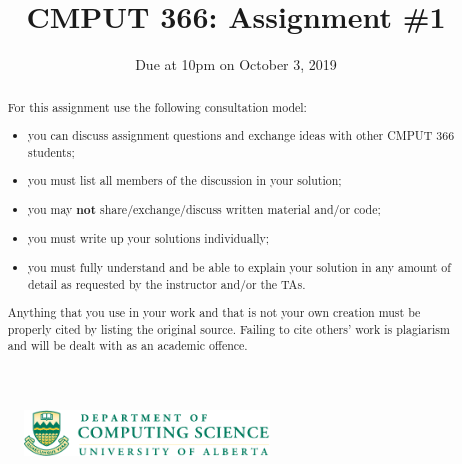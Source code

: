 \documentclass[10pt]{article}
\newcommand{\nin}{\noindent}
\newcommand{\ie}{\item}
\newcommand{\bei}{\begin{itemize}}
\newcommand{\eei}{\end{itemize}}
\newcommand{\tcm}[1]{\textcolor{m7}{#1}}
\begin{document}
\begin{figure}[t!]
\begin{center}
\includegraphics[width=6.5cm]{csLogo.pdf} %
\vspace{-1cm}
\end{center}
\end{figure}



\sloppy


\title{\bf CMPUT 366: Assignment \#1}

\author{\tcm{Due at 10pm on October 3, 2019}}

\date{}




\maketitle

\begin{abstract}
\nin For this assignment use the following consultation model: \bei

\ie you can discuss assignment questions and exchange ideas with other CMPUT 366 students;

\ie you must list all members of the discussion in your solution;

\ie you may {\bf not} share/exchange/discuss written material and/or code;

\ie you must write up your solutions individually;

\ie you must fully understand and be able to explain your solution in any amount of detail as requested by the instructor and/or the TAs.

\eei

\nin Anything that you use in your work and that is not your own creation must be properly cited by listing the original source. Failing to cite others' work is plagiarism and will be dealt with as an academic offence.
\end{abstract}


\vspace{2cm}
\hspace{1cm}{\bf First name:} \underline{\hspace{7cm}}
\end{document}
